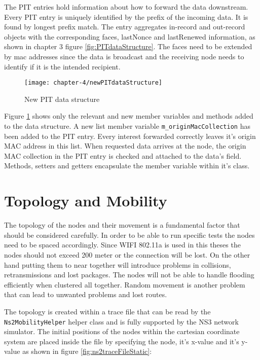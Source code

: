 The PIT entries hold information about how to forward the data downstream. Every PIT entry is uniquely identified by the prefix of the incoming data. It is found by longest prefix match. The entry aggregates in-record and out-record objects with the corresponding faces, lastNonce and lastRenewed information, as shown in chapter 3 figure \ref{fig:PITdataStructure}. The faces need to be extended by mac addresses since the data is broadcast and the receiving node needs to identify if it is the intended recipient.

\begin{figure}[H]
  \centering
  \texttt{[image: chapter-4/newPITdataStructure]}
  \caption{New PIT data structure}
  \label{fig:newPITdataStructure}
\end{figure}

Figure \ref{fig:newPITdataStructure} shows only the relevant and new member variables and methods added to the data structure. A new list member variable \texttt{m\_originMacCollection} has been added to the PIT entry. Every interest forwarded correctly leaves it's origin MAC address in this list. When requested data arrives at the node, the origin MAC collection in the PIT entry is checked and attached to the data's field. Methods, setters and getters encapsulate the member variable within it's class.

\section{Topology and Mobility}

The topology of the nodes and their movement is a fundamental factor that should be considered carefully. In order to be able to run specific tests the nodes need to be spaced accordingly. Since WIFI 802.11a is used in this theses the nodes should not exceed 200 meter or the connection will be lost. On the other hand putting them to near together will introduce problems in collisions, retransmissions and lost packages. The nodes will not be able to handle flooding efficiently when clustered all together. Random movement is another problem that can lead to unwanted problems and lost routes.
 
The topology is created within a trace file that can be read by the \texttt{Ns2MobilityHelper} helper class and is fully supported by the NS3 network simulator. The initial positions of the nodes within the cartesian coordinate system are placed inside the file by specifying the node, it's x-value and it's y-value as shown in figure \ref{fig:ns2traceFileStatic}:

